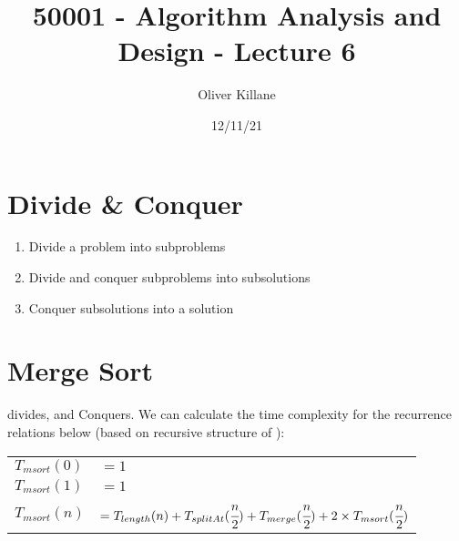 \documentclass{report}
\title{50001 - Algorithm Analysis and Design - Lecture 6}
\author{Oliver Killane}
\date{12/11/21}
\begin{document}
\maketitle
{}

\section*{Divide \& Conquer}
\begin{enumerate}
	\item Divide a problem into subproblems
	\item Divide and conquer subproblems into subsolutions
	\item Conquer subsolutions into a solution
\end{enumerate}

\section*{Merge Sort}
 divides, and  Conquers. We can calculate the time complexity for the recurrence relations below (based on recursive structure of ):
\\ \begin{tabular}{l l }
	$T_{msort}(0) $ & $= 1 $                                                                                                      \\
	$T_{msort}(1) $ & $= 1 $                                                                                                      \\
	$T_{msort}(n) $ & $= T_{length}(n) + T_{splitAt}(\cfrac{n}{2}) + T_{merge}(\cfrac{n}{2}) + 2 \times T_{msort}(\cfrac{n}{2}) $ \\
\end{tabular}
\end{document}
